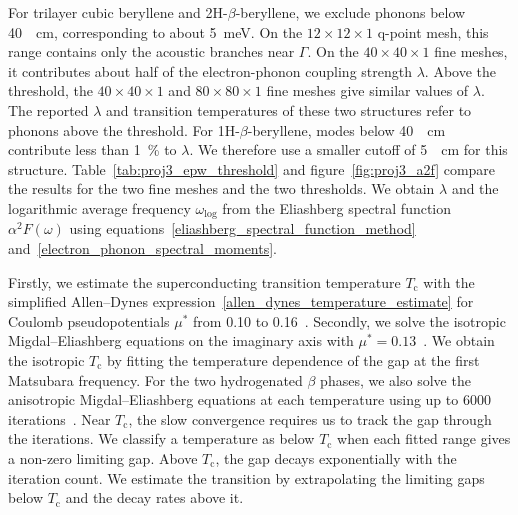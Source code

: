 For trilayer cubic beryllene and 2H-$\beta$-beryllene, we exclude phonons below \qty{40}{\per\centi\metre}, corresponding to about \qty{5}{\milli\electronvolt}.
On the $12 \times 12 \times 1$ q-point mesh, this range contains only the acoustic branches near $\Gamma$.
On the $40 \times 40 \times 1$ fine meshes, it contributes about half of the electron-phonon coupling strength $\lambda$.
Above the threshold, the $40 \times 40 \times 1$ and $80 \times 80 \times 1$ fine meshes give similar values of $\lambda$.
The reported $\lambda$ and transition temperatures of these two structures refer to phonons above the threshold.
For 1H-$\beta$-beryllene, modes below \qty{40}{\per\centi\metre} contribute less than \qty{1}{\percent} to $\lambda$.
We therefore use a smaller cutoff of \qty{5}{\per\centi\metre} for this structure.
Table~\ref{tab:proj3_epw_threshold} and figure~\ref{fig:proj3_a2f} compare the results for the two fine meshes and the two thresholds.
We obtain $\lambda$ and the logarithmic average frequency $\omega_\mathrm{log}$ from the Eliashberg spectral function $\alpha^2F(\omega)$ using equations~\eqref{eliashberg_spectral_function_method} and~\eqref{electron_phonon_spectral_moments}.

Firstly, we estimate the superconducting transition temperature $T_\mathrm{c}$ with the simplified Allen--Dynes expression~\eqref{allen_dynes_temperature_estimate} for Coulomb pseudopotentials $\mu^*$ from 0.10 to 0.16~\cite{allen-dynes,mcmillan1968transition}.
Secondly, we solve the isotropic Migdal--Eliashberg equations on the imaginary axis with $\mu^*=0.13$~\cite{giustino2017electron,eliashberg1960interactions,migdal1958interaction}.
We obtain the isotropic $T_\mathrm{c}$ by fitting the temperature dependence of the gap at the first Matsubara frequency.
For the two hydrogenated $\beta$ phases, we also solve the anisotropic Migdal--Eliashberg equations at each temperature using up to 6000 iterations~\cite{margine2013anisotropic}.
Near $T_\mathrm{c}$, the slow convergence requires us to track the gap through the iterations.
We classify a temperature as below $T_\mathrm{c}$ when each fitted range gives a non-zero limiting gap.
Above $T_\mathrm{c}$, the gap decays exponentially with the iteration count.
We estimate the transition by extrapolating the limiting gaps below $T_\mathrm{c}$ and the decay rates above it.

